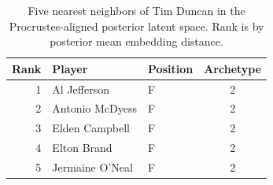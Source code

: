 \begin{table}[htbp]
  \centering\small
  \begin{tabular}{rllc}
    \toprule
    Rank & Player & Position & Archetype \\
    \midrule
    1 & Al Jefferson & F & 2 \\
    2 & Antonio McDyess & F & 2 \\
    3 & Elden Campbell & F & 2 \\
    4 & Elton Brand & F & 2 \\
    5 & Jermaine O'Neal & F & 2 \\
    \bottomrule
  \end{tabular}
  \caption{Five nearest neighbors of Tim Duncan in the Procrustes-aligned posterior latent space. Rank is by posterior mean embedding distance.}
  \label{tab:Tim_Duncan_neighbors}
\end{table}


